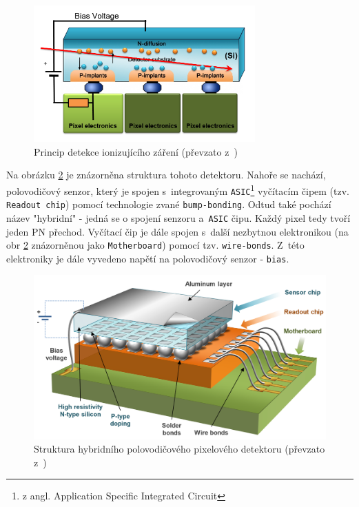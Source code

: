 \begin{figure}[th]
	\begin{center}
		\includegraphics[width=8.5cm]{figures/det_recombination.png}
		\caption{Princip detekce ionizujícího záření (převzato z~\cite{PlatkevicDisertace})}
		\label{fig:det:recomb}
	\end{center}
\end{figure}

Na obrázku \ref{fig:det:chip} je znázorněna struktura tohoto detektoru. Nahoře se nachází, polovodičový senzor, který je spojen s~integrovaným \texttt{ASIC}\footnote{z angl. Application Specific Integrated Circuit} vyčítacím čipem (tzv. \texttt{Readout chip}) pomocí technologie zvané \texttt{bump-bonding}. Odtud také pochází název "hybridní" - jedná se o spojení senzoru a~\texttt{ASIC} čipu. Každý pixel tedy tvoří jeden PN přechod. Vyčítací čip je dále spojen s~další nezbytnou elektronikou (na obr \ref{fig:det:chip} znázorněnou jako \texttt{Motherboard}) pomocí tzv. \texttt{wire-bonds}. Z~této elektroniky je dále vyvedeno napětí na polovodičový senzor - \texttt{bias}.

\begin{figure}[th]
	\begin{center}
		\includegraphics[width=12cm]{figures/det_chip.png}
		\caption{Struktura hybridního polovodičového pixelového detektoru (převzato z~\cite{PlatkevicDisertace})}
		\label{fig:det:chip}
	\end{center}
\end{figure}

